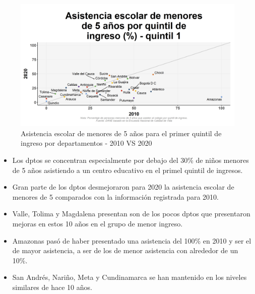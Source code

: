     \begin{figure}[H]
        \caption{Asistencia escolar de menores de 5 años para el primer quintil de ingreso por departamentos - 2010 VS 2020 \label{map_result_2} }
        \begin{center}
        \includegraphics[width=\textwidth,keepaspectratio]{img/var_101_scatter_time.png}
        \end{center}
    \end{figure}
            \begin{itemize}
                \item Los dptos se concentran especialmente por debajo del 30\% de niños menores de 5 años asistiendo a un centro educativo en el primel quintil de ingresos.
                \item Gran parte de los dptos desmejoraron para 2020 la asistencia escolar de menores de 5 comparados con la información registrada para 2010.
                \item Valle, Tolima y Magdalena presentan son de los pocos dptos que presentaron mejoras en estos 10 años en el grupo de menor ingreso.
                \item Amazonas pasó de haber presentado una asistencia del 100\% en 2010 y ser el de mayor asistencia, a ser de los de menor asistencia con alrededor de un 10\%.
                \item San Andrés, Nariño, Meta y Cundinamarca se han mantenido en los niveles similares de hace 10 años.
                \end{itemize}


